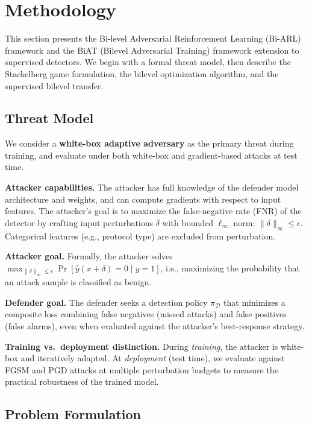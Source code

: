 \section{Methodology}
\label{sec:methodology}

This section presents the Bi-level Adversarial Reinforcement Learning (Bi-ARL) framework and the BiAT (Bilevel Adversarial Training) framework extension to supervised detectors. We begin with a formal threat model, then describe the Stackelberg game formulation, the bilevel optimization algorithm, and the supervised bilevel transfer.

\subsection{Threat Model}
\label{sec:threat_model}

We consider a \textbf{white-box adaptive adversary} as the primary threat during training, and evaluate under both white-box and gradient-based attacks at test time.

\textbf{Attacker capabilities.}
The attacker has full knowledge of the defender model architecture and weights, and can compute gradients with respect to input features. The attacker's goal is to maximize the false-negative rate (FNR) of the detector by crafting input perturbations $\delta$ with bounded $\ell_\infty$ norm: $\|\delta\|_\infty \leq \epsilon$. Categorical features (e.g., protocol type) are excluded from perturbation.

\textbf{Attacker goal.}
Formally, the attacker solves $\max_{\|\delta\|_\infty \leq \epsilon} \Pr[\hat{y}(x + \delta) = 0 \mid y = 1]$, i.e., maximizing the probability that an attack sample is classified as benign.

\textbf{Defender goal.}
The defender seeks a detection policy $\pi_\mathcal{D}$ that minimizes a composite loss combining false negatives (missed attacks) and false positives (false alarms), even when evaluated against the attacker's best-response strategy.

\textbf{Training vs.\ deployment distinction.}
During \emph{training}, the attacker is white-box and iteratively adapted. At \emph{deployment} (test time), we evaluate against FGSM \cite{goodfellow2015fgsm} and PGD \cite{madry2018pgd} attacks at multiple perturbation budgets to measure the practical robustness of the trained model.

\subsection{Problem Formulation}
\label{sec:formulation}

